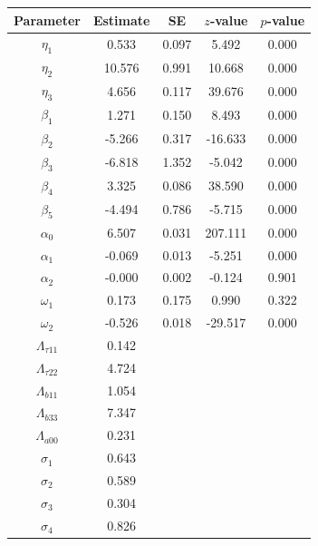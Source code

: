 \begin{table}[ht]
\centering
\begin{tabular}{ccccc}
  \hline
Parameter & Estimate & SE & $z$-value & $p$-value \\ 
  \hline
$\eta_1$ & 0.533 & 0.097 & 5.492 & 0.000 \\ 
  $\eta_2$ & 10.576 & 0.991 & 10.668 & 0.000 \\ 
  $\eta_3$ & 4.656 & 0.117 & 39.676 & 0.000 \\ 
  $\beta_1$ & 1.271 & 0.150 & 8.493 & 0.000 \\ 
  $\beta_2$ & -5.266 & 0.317 & -16.633 & 0.000 \\ 
  $\beta_3$ & -6.818 & 1.352 & -5.042 & 0.000 \\ 
  $\beta_4$ & 3.325 & 0.086 & 38.590 & 0.000 \\ 
  $\beta_5$ & -4.494 & 0.786 & -5.715 & 0.000 \\ 
  $\alpha_0$ & 6.507 & 0.031 & 207.111 & 0.000 \\ 
  $\alpha_1$ & -0.069 & 0.013 & -5.251 & 0.000 \\ 
  $\alpha_2$ & -0.000 & 0.002 & -0.124 & 0.901 \\ 
  $\omega_1$ & 0.173 & 0.175 & 0.990 & 0.322 \\ 
  $\omega_2$ & -0.526 & 0.018 & -29.517 & 0.000 \\ 
  $\Lambda_{\tau11}$ & 0.142 &  &  &  \\ 
  $\Lambda_{\tau22}$ & 4.724 &  &  &  \\ 
  $\Lambda_{b11}$ & 1.054 &  &  &  \\ 
  $\Lambda_{b33}$ & 7.347 &  &  &  \\ 
  $\Lambda_{a00}$ & 0.231 &  &  &  \\ 
  $\sigma_1$ & 0.643 &  &  &  \\ 
  $\sigma_2$ & 0.589 &  &  &  \\ 
  $\sigma_3$ & 0.304 &  &  &  \\ 
  $\sigma_4$ & 0.826 &  &  &  \\ 
   \hline
\end{tabular}
\end{table}
